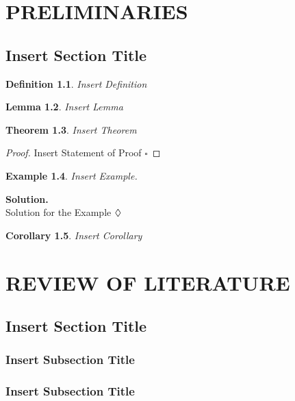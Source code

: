 \documentclass[12pt,a4paper,oneside]{book}
\theoremstyle{plain}
\newtheorem{thm}{Theorem}[chapter]
\newtheorem{lem}[thm]{Lemma}
\newtheorem{cor}[thm]{Corollary}
\newtheorem{ex}[thm]{Example}
\newtheorem{de}[thm]{Definition}
\numberwithin{equation}{chapter} \DeclareMathOperator{\Var}{Var}
\newcommand*{\QEDA}{\hfill\ensuremath{\large{\lozenge}}}
\newcommand*{\QEDAa}{\hfill\ensuremath{\square}}
\begin{document}
\chapter{PRELIMINARIES}

\section{Insert Section Title}\label{Sec2.1}

\begin{de}\label{def1}
	Insert Definition
\end{de}

\vspace{1cm}

\begin{lem}\label{lem1}
	Insert Lemma
\end{lem}

\vspace{1cm}

\begin{thm}\label{thm1}
	Insert Theorem
\end{thm}

\noindent\begin{proof}
	Insert Statement of Proof
	\QEDAa
\end{proof}

\vspace{1cm}

\begin{ex}\label{ex1}
	Insert Example.
\end{ex}
\noindent\textbf{Solution.}\\
Solution for the Example \QEDA

\vspace{1cm}

\begin{cor}
	Insert Corollary
\end{cor}


\chapter{REVIEW OF LITERATURE}
\section{Insert Section Title}\label{Sec3.1}
\subsection{Insert Subsection Title}\label{sub3.1.1}
\subsection{Insert Subsection Title}\label{sub3.1.2}
\end{document}
